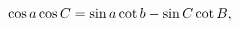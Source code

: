 \[\mathop{\cos\/}\nolimits a\mathop{\cos\/}\nolimits C=\mathop{\sin\/}\nolimits a%
\mathop{\cot\/}\nolimits b-\mathop{\sin\/}\nolimits C\mathop{\cot\/}\nolimits B,\]